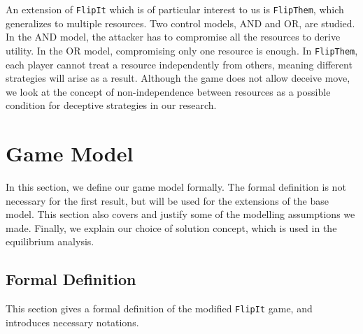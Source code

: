 \documentclass[11pt]{article}
\theoremstyle{plain}
\begin{document}
An extension of \texttt{FlipIt} which is of particular interest to us is \texttt{FlipThem}\cite{Laszka2014},
which generalizes to multiple resources. Two control models, AND and OR, are studied. In the AND model, the attacker has to compromise all the resources to derive utility. In the OR model, compromising only one resource is enough. In \texttt{FlipThem}, each player cannot treat a resource independently from others, meaning different strategies will arise as a result. Although the game does not allow deceive move, we look at the concept of non-independence between resources as a possible condition for deceptive strategies in our research.

\section{Game Model}

In this section, we define our game model formally. The formal definition is not necessary for the first result, but will be used for the extensions of the base model. This section also covers and justify some of the modelling assumptions we made. Finally, we explain our choice of solution concept, which is used in the equilibrium analysis. 


\subsection{Formal Definition}
This section gives a formal definition of the modified \texttt{FlipIt} game, and introduces necessary notations.
\end{document}
